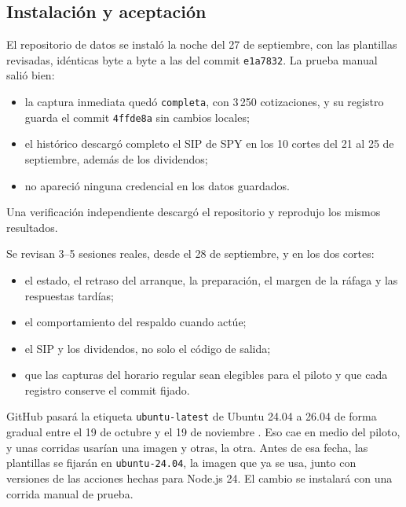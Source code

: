 \subsection{Instalación y aceptación}\label{sec:estado_instalacion}

El repositorio de datos se instaló la noche del 27 de septiembre, con las plantillas revisadas, idénticas
byte a byte a las del commit \texttt{e1a7832}. La prueba manual salió bien:
\begin{itemize}
\item la captura inmediata quedó \texttt{completa}, con 3\,250 cotizaciones, y su registro guarda el commit
\texttt{4ffde8a} sin cambios locales;
\item el histórico descargó completo el SIP de SPY en los 10 cortes del 21 al 25 de septiembre, además de los
dividendos;
\item no apareció ninguna credencial en los datos guardados.
\end{itemize}
Una verificación independiente descargó el repositorio y reprodujo los mismos resultados.

\begin{criterio}
Se revisan 3--5 sesiones reales, desde el 28 de septiembre, y en los dos cortes:
\begin{itemize}
\item el estado, el retraso del arranque, la preparación, el margen de la ráfaga y las respuestas tardías;
\item el comportamiento del respaldo cuando actúe;
\item el SIP y los dividendos, no solo el código de salida;
\item que las capturas del horario regular sean elegibles para el piloto y que cada registro conserve el
commit fijado.
\end{itemize}
\end{criterio}

\begin{notatecnica}
GitHub pasará la etiqueta \texttt{ubuntu-latest} de Ubuntu 24.04 a 26.04 de forma gradual entre el 19 de
octubre y el 19 de noviembre \citep{github2026}. Eso cae en medio del piloto, y unas corridas usarían una
imagen y otras, la otra. Antes de esa fecha, las plantillas se fijarán en \texttt{ubuntu-24.04}, la imagen que
ya se usa, junto con versiones de las acciones hechas para Node.js 24. El cambio se instalará con una corrida
manual de prueba.
\end{notatecnica}


